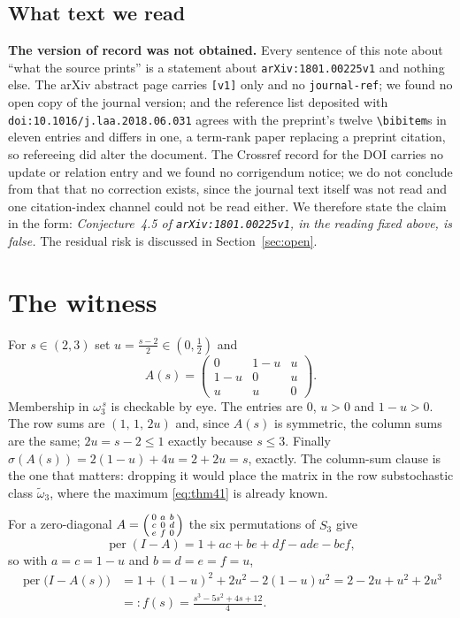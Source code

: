 \documentclass[11pt]{amsart}
\theoremstyle{remark}
\DeclareMathOperator{\per}{per}
\newcommand{\ws}{\omega}
\newcommand{\wt}{\tilde{\omega}}
\begin{document}
\subsection*{What text we read}
\textbf{The version of record was not obtained.} Every sentence of this note about
``what the source prints'' is a statement about \texttt{arXiv:1801.00225v1} and
nothing else. The arXiv abstract page carries \texttt{[v1]} only and no
\texttt{journal-ref}; we found no open copy of the journal version; and the reference
list deposited with \texttt{doi:10.1016/j.laa.2018.06.031} agrees with the preprint's
twelve \verb|\bibitem|s in eleven entries and differs in one, a term-rank paper
replacing a preprint citation, so refereeing did alter the document. The Crossref
record for the DOI carries no update or relation entry and we found no corrigendum
notice; we do not conclude from that that no correction exists, since the journal text
itself was not read and one citation-index channel could not be read either. We
therefore state the claim in the form: \emph{Conjecture~4.5 of
\texttt{arXiv:1801.00225v1}, in the reading fixed above, is false.} The residual risk
is discussed in Section~\ref{sec:open}.

\section{The witness}\label{sec:wit}

For $s\in(2,3)$ set $u=\frac{s-2}{2}\in(0,\tfrac12)$ and
\begin{equation}\label{eq:A}
 A(s)=\begin{pmatrix}0&1-u&u\\ 1-u&0&u\\ u&u&0\end{pmatrix}.
\end{equation}
Membership in $\ws_3^{\,s}$ is checkable by eye. The entries are $0$, $u>0$ and
$1-u>0$. The row sums are $(1,\,1,\,2u)$ and, since $A(s)$ is symmetric, the column
sums are the same; $2u=s-2\le1$ exactly because $s\le3$. Finally
$\sigma(A(s))=2(1-u)+4u=2+2u=s$, exactly. The column-sum clause is the one that
matters: dropping it would place the matrix in the row substochastic class
$\wt_3$, where the maximum \eqref{eq:thm41} is already known.

For a zero-diagonal $A=\begin{psmallmatrix}0&a&b\\c&0&d\\e&f&0\end{psmallmatrix}$ the
six permutations of $S_3$ give
\begin{equation}\label{eq:per3}
 \per(I-A)=1+ac+be+df-ade-bcf ,
\end{equation}
so with $a=c=1-u$ and $b=d=e=f=u$,
\begin{equation}\label{eq:f}
\begin{split}
 \per\bigl(I-A(s)\bigr)&=1+(1-u)^{2}+2u^{2}-2(1-u)u^{2}=2-2u+u^{2}+2u^{3}\\
 &=:f(s)=\frac{s^{3}-5s^{2}+4s+12}{4}.
\end{split}
\end{equation}
\end{document}
